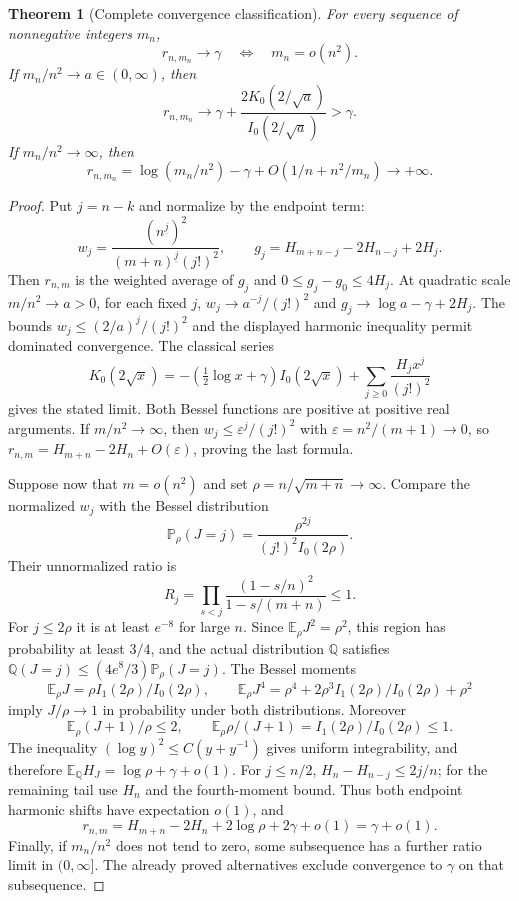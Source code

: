\documentclass[11pt,a4paper]{article}
\newtheorem{theorem}{Theorem}[section]
\theoremstyle{definition}
\theoremstyle{remark}
\numberwithin{equation}{section}
\begin{document}
\begin{theorem}[Complete convergence classification]
\label{ec:moving-theorem}
For every sequence of nonnegative integers $m_n$,
\[
 r_{n,m_n}\to\gamma\quad\Longleftrightarrow\quad m_n=o(n^2).
\]
If $m_n/n^2\to a\in(0,\infty)$, then
\[
 r_{n,m_n}\longrightarrow
 \gamma+\frac{2K_0(2/\sqrt a)}{I_0(2/\sqrt a)}>\gamma.
\]
If $m_n/n^2\to\infty$, then
\[
 r_{n,m_n}=\log(m_n/n^2)-\gamma
 +O(1/n+n^2/m_n)\longrightarrow+\infty.
\]
\end{theorem}
\begin{proof}
Put $j=n-k$ and normalize by the endpoint term:
\[
 w_j=\frac{(n^{\underline j})^2}
           {(m+n)^{\underline j}(j!)^2},\qquad
 g_j=H_{m+n-j}-2H_{n-j}+2H_j.
\]
Then $r_{n,m}$ is the weighted average of $g_j$ and
$0\le g_j-g_0\le4H_j$.
At quadratic scale $m/n^2\to a>0$, for each fixed $j$,
$w_j\to a^{-j}/(j!)^2$ and $g_j\to\log a-\gamma+2H_j$.
The bounds $w_j\le(2/a)^j/(j!)^2$ and the displayed harmonic inequality
permit dominated convergence.  The classical series
\[
 K_0(2\sqrt x)=-(\tfrac12\log x+\gamma)I_0(2\sqrt x)
               +\sum_{j\ge0}\frac{H_jx^j}{(j!)^2}
\]
gives the stated limit.  Both Bessel functions are positive at positive
real arguments.  If $m/n^2\to\infty$, then
$w_j\le\varepsilon^j/(j!)^2$ with $\varepsilon=n^2/(m+1)\to0$,
so $r_{n,m}=H_{m+n}-2H_n+O(\varepsilon)$, proving the last formula.

Suppose now that $m=o(n^2)$ and set $\rho=n/\sqrt{m+n}\to\infty$.
Compare the normalized $w_j$ with the Bessel distribution
\[
 \mathbb P_\rho(J=j)=\frac{\rho^{2j}}{(j!)^2I_0(2\rho)}.
\]
Their unnormalized ratio is
\[
 R_j=\prod_{s<j}\frac{(1-s/n)^2}{1-s/(m+n)}\le1.
\]
For $j\le2\rho$ it is at least $e^{-8}$ for large $n$.  Since
$\mathbb E_\rho J^2=\rho^2$, this region has probability at least
$3/4$, and the actual distribution $\mathbb Q$ satisfies
$\mathbb Q(J=j)\le(4e^8/3)\mathbb P_\rho(J=j)$.
The Bessel moments
\[
 \mathbb E_\rho J=\rho I_1(2\rho)/I_0(2\rho),\qquad
 \mathbb E_\rho J^4=\rho^4+2\rho^3I_1(2\rho)/I_0(2\rho)+\rho^2
\]
imply $J/\rho\to1$ in probability under both distributions.
Moreover
\[
 \mathbb E_\rho (J+1)/\rho\le2,\qquad
 \mathbb E_\rho\rho/(J+1)=I_1(2\rho)/I_0(2\rho)\le1.
\]
The inequality $(\log y)^2\le C(y+y^{-1})$ gives uniform
integrability, and therefore
$\mathbb E_{\mathbb Q}H_J=\log\rho+\gamma+o(1)$.
For $j\le n/2$, $H_n-H_{n-j}\le2j/n$; for the remaining tail use
$H_n$ and the fourth-moment bound.  Thus both endpoint harmonic shifts
have expectation $o(1)$, and
\[
 r_{n,m}=H_{m+n}-2H_n+2\log\rho+2\gamma+o(1)=\gamma+o(1).
\]
Finally, if $m_n/n^2$ does not tend to zero, some subsequence has a
further ratio limit in $(0,\infty]$.  The already proved alternatives
exclude convergence to $\gamma$ on that subsequence.
\end{proof}
\end{document}
